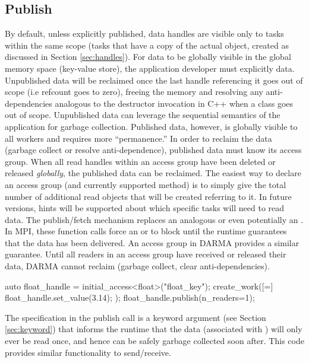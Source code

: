 \subsection{Publish}
\label{subsec:publish}
By default, unless explicitly published, data handles are visible only to tasks
within the same scope (tasks that have a copy of the actual
\ahandleT object, created as discussed in
Section \ref{sec:handles}).
For data to be globally visible in the global memory space (key-value store),
the application developer must explicitly  data.  
Unpublished data will be reclaimed once the last handle referencing it goes out of scope (i.e refcount goes to zero),
freeing the memory and resolving any anti-dependencies analogous to the
destructor invocation in C++ when a class goes out of scope.  
Unpublished data can leverage the sequential semantics of the application for garbage collection.  
Published data, however, is globally visible to all workers and requires more ``permanence.''  
In order to reclaim the data (garbage collect or resolve anti-dependence), published data must know its access group.
When all read handles within an access group have been deleted or released \emph{globally}, the published data can be reclaimed.
The easiest way to declare an access group (and currently supported method) is
to simply give the total number of additional read \ahandleT objects that will be created referring to it.
In future versions, hints will be supported about which specific tasks will need to read data.
The publish/fetch mechanism replaces an analogous  or even potentially an .
In MPI, these function calls force an  or  to block until the runtime guarantees that the data has been delivered.
An access group in DARMA provides a similar guarantee.
Until all readers in an access group have received or released their data, DARMA cannot reclaim (garbage collect, clear anti-dependencies).

\begin{CppCode}
auto float_handle = initial_access<float>("float_key");
create_work([=]{
  float_handle.set_value(3.14);
});
float_handle.publish(n_readers=1);
\end{CppCode}
The  specification in the publish call is a keyword
argument (see Section \ref{sec:keyword}) that informs the runtime that the data
(associated with ) will only ever be read once, and hence can be safely garbage collected soon after.  
This code provides similar functionality to send/receive.

